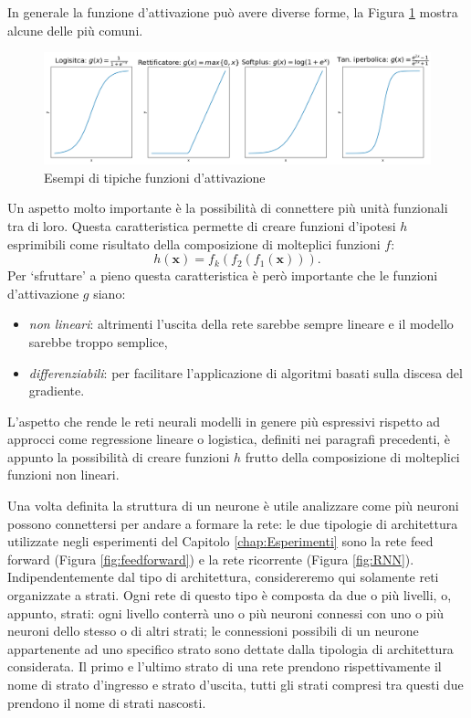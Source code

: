 \documentclass[../../main.tex]{subfiles}
\begin{document}
In generale la funzione d'attivazione può avere diverse forme, la Figura \ref{fig:activations} mostra alcune delle più comuni.

\begin{figure}[H]
    \centering
    \includegraphics[width=\textwidth]{immagini/4_2/activation_func.png}
    \caption{Esempi di tipiche funzioni d'attivazione}
    \label{fig:activations}
\end{figure}

Un aspetto molto importante è la possibilità di connettere più unità funzionali tra di loro. Questa caratteristica permette di creare funzioni d'ipotesi $h$ esprimibili come risultato della composizione di molteplici funzioni $f$: 
\[h(\boldsymbol{x}) = f_k\left(f_2\left(f_1(\boldsymbol{x})\right)\right).\]
Per  `sfruttare' a pieno questa caratteristica è però importante che le funzioni d'attivazione $g$ siano:
\begin{itemize}
    \item \textit{non lineari}: altrimenti l’uscita della rete sarebbe sempre lineare e il modello sarebbe troppo semplice,
    \item \textit{differenziabili}: per facilitare l'applicazione di algoritmi basati sulla discesa del gradiente.
\end{itemize}
L'aspetto che rende le reti neurali modelli in genere più espressivi rispetto ad approcci come regressione lineare o logistica, definiti nei paragrafi precedenti, è appunto la possibilità di creare funzioni $h$ frutto della composizione di molteplici funzioni non lineari.

Una volta definita la struttura di un neurone è utile analizzare come più neuroni possono connettersi per andare a formare la rete: le due tipologie di architettura utilizzate negli esperimenti del Capitolo \ref{chap:Esperimenti} sono la rete feed forward (Figura \ref{fig:feedforward}) e la rete ricorrente (Figura \ref{fig:RNN}). Indipendentemente dal tipo di architettura, considereremo qui solamente reti organizzate a strati. Ogni rete di questo tipo è composta da due o più livelli, o, appunto, strati: ogni livello conterrà uno o più neuroni connessi con uno o più neuroni dello stesso o di altri strati; le connessioni possibili di un neurone appartenente ad uno specifico strato sono dettate dalla tipologia di architettura considerata. Il primo e l'ultimo strato di una rete prendono rispettivamente il nome di strato d'ingresso e strato d'uscita, tutti gli strati compresi tra questi due prendono il nome di strati nascosti.
\end{document}
